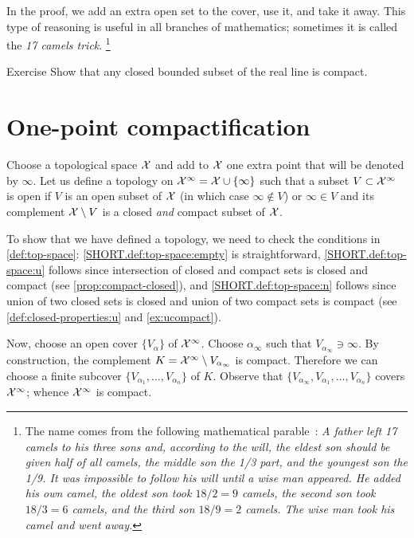 In the proof, we add an extra open set to the cover, use it, and take it away.
This type of reasoning is useful in all branches of mathematics;
sometimes it is called the \emph{17 camels trick}.%
\footnote{The name comes from the following mathematical parable~\cite{petrov}:
\textit{A father left 17 camels to his three sons and, according to the will,
the eldest son should be given half of all camels,
the middle son the 1/3 part,
and the youngest son the 1/9.
It was impossible to follow his will until a wise man appeared.
He added his own camel, the oldest son took $18/2=9$ camels, the second son took $18/3=6$ camels, and the third son $18/9=2$ camels.
The wise man took his camel and went away.}}


\begin{thm}{Exercise}\label{ex:closed-bounded=compact}
Show that any closed bounded subset of the real line is compact.
\end{thm}


\section{One-point compactification}



Choose a topological space $\mathcal{X}$ and add to $\mathcal{X}$ one extra point that will be denoted by $\infty$.
Let us define a topology on $\mathcal{X}^\infty=\mathcal{X}\cup\{\infty\}$ such that
a subset $V\subset\mathcal{X}^\infty$ is open if $V$ is an open subset of $\mathcal{X}$ (in which case $\infty\notin V$) or $\infty\in V$ and its complement $\mathcal{X}\setminus V$ is a closed \textit{and} compact subset of $\mathcal{X}$.

To show that we have defined a topology, we need to check the conditions in \ref{def:top-space}:
\ref{SHORT.def:top-space:empty} is straightforward, \ref{SHORT.def:top-space:u} follows since intersection of closed and compact sets is closed and compact (see \ref{prop:compact-closed}), and \ref{SHORT.def:top-space:n} follows since union of two closed sets is closed and union of two compact sets is compact (see \ref{def:closed-properties:u} and \ref{ex:ucompact}).

Now, choose an open cover $\{V_\alpha\}$ of $\mathcal{X}^\infty$.
Choose $\alpha_\infty$ such that $V_{\alpha_\infty}\ni\infty$.
By construction, the complement $K=\mathcal{X}^\infty\setminus V_{\alpha_\infty}$ is compact.
Therefore we can choose a finite subcover $\{V_{\alpha_1}, \ldots, V_{\alpha_n}\}$ of $K$.
Observe that $\{V_{\alpha_\infty},V_{\alpha_1}, \ldots, V_{\alpha_n}\}$ covers $\mathcal{X}^\infty$;
whence $\mathcal{X}^\infty$ is compact.


